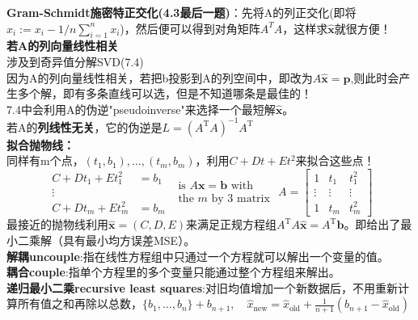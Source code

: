     \textbf{Gram-Schmidt施密特正交化(4.3最后一题)}：先将A的列正交化(即将$x_i := x_i - 1/n\sum_{i=1}^{n}x_i$)，然后便可以得到对角矩阵$A^T A$，这样求$\widehat{\bm{x}}$就很方便！
    \\
    \textbf{若A的列向量线性相关}\\
    涉及到奇异值分解SVD(7.4)\\
    因为A的列向量线性相关，若把b投影到A的列空间中，即改为$A \widehat{\boldsymbol{x}}=\boldsymbol{p}$,则此时会产生多个解，即有多条直线可以选，但是不知道哪条是最佳的！
    \\
    7.4中会利用A的伪逆"pseudoinverse"来选择一个最短解$\widehat{\bm{x}}$。\\
    若A的\textbf{列线性无关}，它的伪逆是$L=\left(A^{\mathrm{T}} A\right)^{-1} A^{\mathrm{T}}$
    \\
    \textbf{拟合抛物线：}\\
    同样有m个点，$(t_{1},b_{1}), \dots, (t_{m},b_{m})$，利用$C+D t+E t^{2}$来拟合这些点！\\
    $$
    \begin{aligned} C+D t_{1}+E t_{1}^{2} &=b_{1} \\ \vdots & \\ C+D t_{m}+E t_{m}^{2} &=b_{m} \end{aligned}
    \begin{array}{l}{\text { is } A \boldsymbol{x}=\boldsymbol{b} \text { with }} \\ {\text { the } m \text { by } 3 \text { matrix }}\end{array}
    A=\left[\begin{array}{ccc}{1} & {t_{1}} & {t_{1}^{2}} \\ {\vdots} & {\vdots} & {\vdots} \\ {1} & {t_{m}} & {t_{m}^{2}}\end{array}\right]
    $$
    最接近的抛物线利用$\widehat{\boldsymbol{x}}=(C, D, E)$来满足正规方程组$A^{\mathrm{T}} A \widehat{\boldsymbol{x}}=A^{\mathrm{T}} \boldsymbol{b}$。即给出了最小二乘解（具有最小均方误差MSE）。
    \\
    \textbf{解耦uncouple}:指在线性方程组中只通过一个方程就可以解出一个变量的值。\\
    \textbf{耦合couple}:指单个方程里的多个变量只能通过整个方程组来解出。
    \\
    \textbf{递归最小二乘recursive least squares}:对旧均值增加一个新数据后，不用重新计算所有值之和再除以总数，$\{b_1,\dots, b_n\}+ b_{n+1},\quad \widehat{x}_{\mathrm{new}}=\widehat{x}_{\mathrm{old}}+\frac{1}{n+1}\left(b_{n+1}-\widehat{x}_{\mathrm{old}}\right)$
    \\
